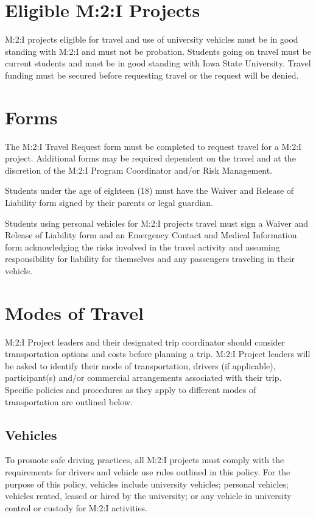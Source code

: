 \section{Eligible M:2:I Projects}
M:2:I projects eligible for travel and use of university vehicles must be in good standing with M:2:I and must not be probation.  Students going on travel must be current students and must be in good standing with Iowa State University.  Travel funding must be secured before requesting travel or the request will be denied.

\section{Forms}
The M:2:I Travel Request form must be completed to request travel for a M:2:I project.  Additional forms may be required dependent on the travel and at the discretion of the M:2:I Program Coordinator and/or Risk Management.

Students under the age of eighteen (18) must have the Waiver and Release of Liability form signed by their parents or legal guardian.

Students using personal vehicles for M:2:I projects travel must sign a Waiver and Release of Liability form and an Emergency Contact and Medical Information form acknowledging the risks involved in the travel activity and assuming responsibility for liability for themselves and any passengers traveling in their vehicle.


\section{Modes of Travel}
M:2:I Project leaders and their designated trip coordinator should consider transportation options and costs before planning a trip. M:2:I Project leaders will be asked to identify their mode of transportation, drivers (if applicable), participant(s) and/or commercial arrangements associated with their trip. Specific policies and procedures as they apply to different modes of transportation are outlined below.

\subsection{Vehicles}
To promote safe driving practices, all M:2:I projects must comply with the requirements for drivers and vehicle use rules outlined in this policy. For the purpose of this policy, vehicles include university vehicles; personal vehicles; vehicles rented, leased or hired by the university; or any vehicle in university control or custody for M:2:I activities.

